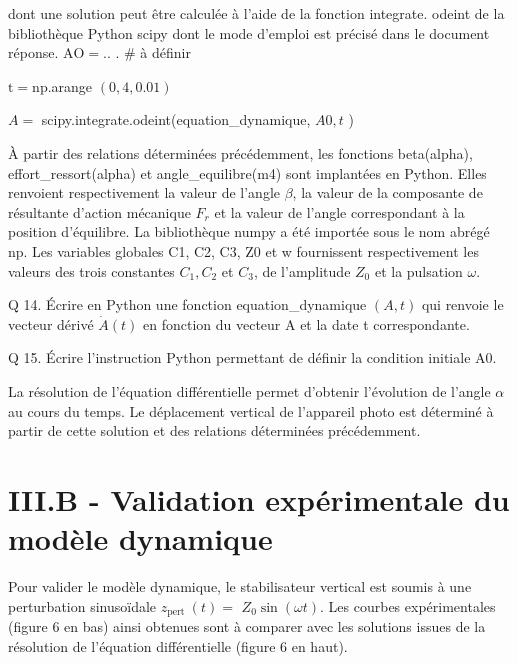 \documentclass[10pt]{article}
\begin{document}
dont une solution peut être calculée à l'aide de la fonction integrate. odeint de la bibliothèque Python scipy dont le mode d'emploi est précisé dans le document réponse. $\mathrm{AO}=.$. . \# à définir

$\mathrm{t}=\mathrm{np}$.arange $(0,4,0.01)$

$A=$ scipy.integrate.odeint(equation\_dynamique, $A 0, t$ )

À partir des relations déterminées précédemment, les fonctions beta(alpha), effort\_ressort(alpha) et angle\_equilibre(m4) sont implantées en Python. Elles renvoient respectivement la valeur de l'angle $\beta$, la valeur de la composante de résultante d'action mécanique $F_{r}$ et la valeur de l'angle correspondant à la position d'équilibre. La bibliothèque numpy a été importée sous le nom abrégé np. Les variables globales C1, C2, C3, Z0 et w fournissent respectivement les valeurs des trois constantes $C_{1}, C_{2}$ et $C_{3}$, de l'amplitude $Z_{0}$ et la pulsation $\omega$.

Q 14. Écrire en Python une fonction equation\_dynamique $(A, t)$ qui renvoie le vecteur dérivé $\dot{A}(t)$ en fonction du vecteur A et la date t correspondante.

Q 15. Écrire l'instruction Python permettant de définir la condition initiale A0.

La résolution de l'équation différentielle permet d'obtenir l'évolution de l'angle $\alpha$ au cours du temps. Le déplacement vertical de l'appareil photo est déterminé à partir de cette solution et des relations déterminées précédemment.

\section{III.B - Validation expérimentale du modèle dynamique}
Pour valider le modèle dynamique, le stabilisateur vertical est soumis à une perturbation sinusoïdale $z_{\text {pert }}(t)=$ $Z_{0} \sin (\omega t)$. Les courbes expérimentales (figure 6 en bas) ainsi obtenues sont à comparer avec les solutions issues de la résolution de l'équation différentielle (figure 6 en haut).
\end{document}

